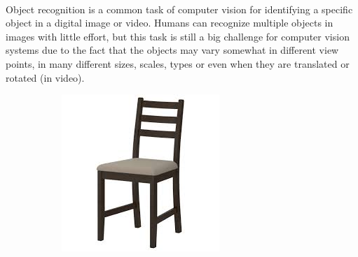 \paragraph*{}
Object recognition is a common task of computer vision for identifying a specific object in a digital image or video. Humans can recognize multiple objects in images with little effort, but this task is still a big challenge for computer vision systems due to the fact that the objects may vary somewhat in different view points, in many different sizes, scales, types or even when they are translated or rotated (in video). 

\begin{figure}[h!]
	\captionsetup{width=0.8\textwidth}
	\centering
	\begin{subfigure}[b]{0.2\linewidth}
		\includegraphics[width=\linewidth]{images/chairs/0.jpeg}
	\end{subfigure}
	\begin{subfigure}[b]{0.2\linewidth}

\end{subfigure}
\end{figure}
